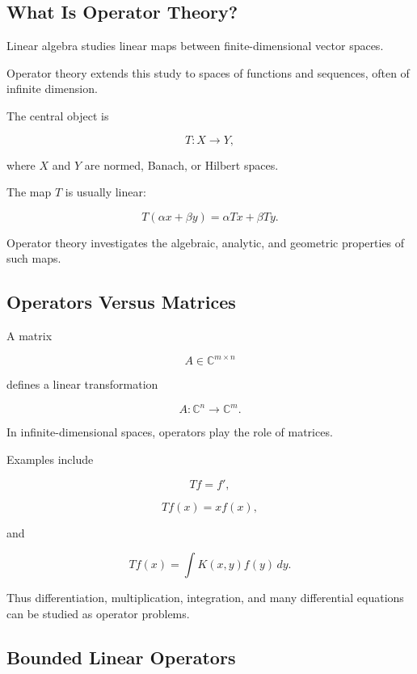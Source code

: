 \subsection{What Is Operator Theory?}
\label{subsec:what-is-operator-theory}

Linear algebra studies linear maps between finite-dimensional vector
spaces.

Operator theory extends this study to spaces of functions and sequences,
often of infinite dimension.

The central object is

\[
\boxed{
T:X\to Y,
}
\]

where \(X\) and \(Y\) are normed, Banach, or Hilbert spaces.

The map \(T\) is usually linear:

\[
\boxed{
T(\alpha x+\beta y)
=
\alpha Tx+\beta Ty.
}
\]

Operator theory investigates the algebraic, analytic, and geometric
properties of such maps.

\subsection{Operators Versus Matrices}
\label{subsec:operators-versus-matrices}

A matrix

\[
A\in\mathbb{C}^{m\times n}
\]

defines a linear transformation

\[
A:\mathbb{C}^n\to\mathbb{C}^m.
\]

In infinite-dimensional spaces, operators play the role of matrices.

Examples include

\[
\boxed{
Tf=f',
}
\]

\[
\boxed{
Tf(x)=x f(x),
}
\]

and

\[
\boxed{
Tf(x)
=
\int K(x,y)f(y)\,dy.
}
\]

Thus differentiation, multiplication, integration, and many differential
equations can be studied as operator problems.

\subsection{Bounded Linear Operators}
\label{subsec:bounded-linear-operators}

